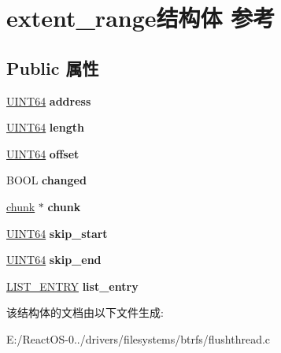 \hypertarget{structextent__range}{}\section{extent\+\_\+range结构体 参考}
\label{structextent__range}
\subsection*{Public 属性}
\begin{DoxyCompactItemize}
\item 
\mbox{\label{structextent__range_a93e64f947f007d3ef9917c5d55dbd008}} 
\hyperlink{_processor_bind_8h_a57be03562867144161c1bfee95ca8f7c}{U\+I\+N\+T64} {\bfseries address}
\item 
\mbox{\label{structextent__range_a456e0eb5e22d9fb1275362104d9d3a42}} 
\hyperlink{_processor_bind_8h_a57be03562867144161c1bfee95ca8f7c}{U\+I\+N\+T64} {\bfseries length}
\item 
\mbox{\label{structextent__range_afaf67809df9066c230dda7b56223c0eb}} 
\hyperlink{_processor_bind_8h_a57be03562867144161c1bfee95ca8f7c}{U\+I\+N\+T64} {\bfseries offset}
\item 
\mbox{\label{structextent__range_a8b7a8cc21924640c50e22e6c131bf4ae}} 
B\+O\+OL {\bfseries changed}
\item 
\mbox{\label{structextent__range_ab3284916d307a580af716eb5f502f7fa}} 
\hyperlink{structchunk}{chunk} $\ast$ {\bfseries chunk}
\item 
\mbox{\label{structextent__range_aaca3e213e50af5480188e002c9a7ac8f}} 
\hyperlink{_processor_bind_8h_a57be03562867144161c1bfee95ca8f7c}{U\+I\+N\+T64} {\bfseries skip\+\_\+start}
\item 
\mbox{\label{structextent__range_a5f807bce6a47edbd89dc8f3012ac7f23}} 
\hyperlink{_processor_bind_8h_a57be03562867144161c1bfee95ca8f7c}{U\+I\+N\+T64} {\bfseries skip\+\_\+end}
\item 
\mbox{\label{structextent__range_a9d6c5302e36b72f8caba4b7d4338ec1d}} 
\hyperlink{struct___l_i_s_t___e_n_t_r_y}{L\+I\+S\+T\+\_\+\+E\+N\+T\+RY} {\bfseries list\+\_\+entry}
\end{DoxyCompactItemize}


该结构体的文档由以下文件生成\+:\begin{DoxyCompactItemize}
\item 
E\+:/\+React\+O\+S-\/0../drivers/filesystems/btrfs/flushthread.\+c\end{DoxyCompactItemize}
